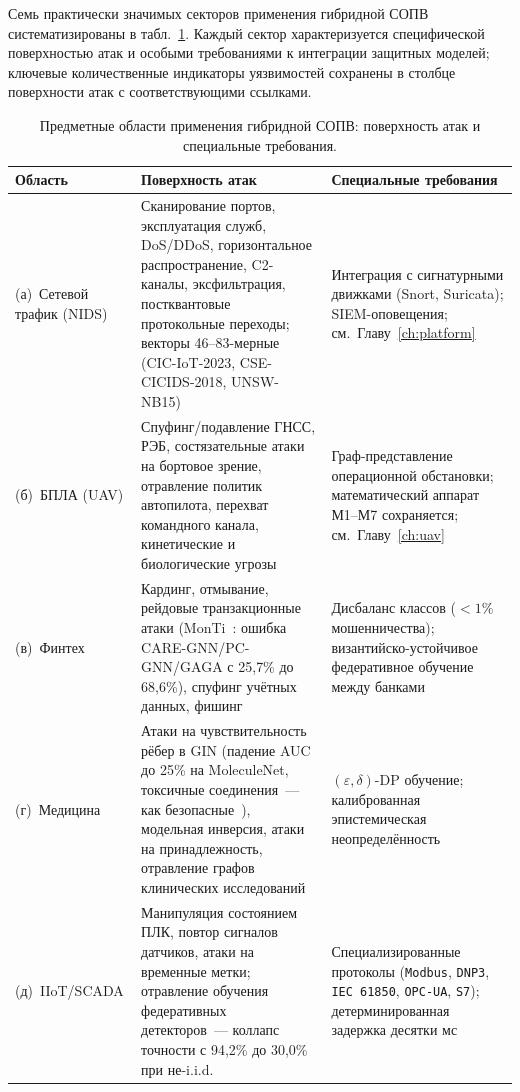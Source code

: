 Семь практически значимых секторов применения гибридной СОПВ систематизированы в табл.~\ref{tab:idps_sectors}. Каждый сектор характеризуется специфической поверхностью атак и особыми требованиями к интеграции защитных моделей; ключевые количественные индикаторы уязвимостей сохранены в столбце поверхности атак с соответствующими ссылками.

\begin{table}[htbp]
\centering
\caption{Предметные области применения гибридной СОПВ: поверхность атак и специальные требования.}
\label{tab:idps_sectors}
\small
\setlength{\tabcolsep}{4pt}
\begin{tabular}{p{2.8cm} p{6.5cm} p{5.0cm}}
\toprule
\textbf{Область} & \textbf{Поверхность атак} & \textbf{Специальные требования} \\
\midrule
(а)~Сетевой трафик (NIDS) & Сканирование портов, эксплуатация служб, DoS/DDoS, горизонтальное распространение, C2-каналы, эксфильтрация, постквантовые протокольные переходы; векторы 46--83-мерные (CIC-IoT-2023, CSE-CICIDS-2018, UNSW-NB15) & Интеграция с сигнатурными движками (Snort, Suricata); SIEM-оповещения; см.\ Главу~\ref{ch:platform} \\
\addlinespace
(б)~БПЛА (UAV) & Спуфинг/подавление ГНСС, РЭБ, состязательные атаки на бортовое зрение, отравление политик автопилота, перехват командного канала, кинетические и биологические угрозы & Граф-представление операционной обстановки; математический аппарат М1--М7 сохраняется; см.\ Главу~\ref{ch:uav} \\
\addlinespace
(в)~Финтех & Кардинг, отмывание, рейдовые транзакционные атаки (MonTi~\cite{MonTi2025}: ошибка CARE-GNN/PC-GNN/GAGA с 25{,}7\% до 68{,}6\%), спуфинг учётных данных, фишинг & Дисбаланс классов ($<\!1\%$ мошенничества); византийско-устойчивое федеративное обучение между банками \\
\addlinespace
(г)~Медицина & Атаки на чувствительность рёбер в GIN (падение AUC до 25\% на MoleculeNet, токсичные соединения~--- как безопасные~\cite{EdgeSensitivity2025}), модельная инверсия, атаки на принадлежность, отравление графов клинических исследований & $(\varepsilon,\delta)$-DP обучение; калиброванная эпистемическая неопределённость \\
\addlinespace
(д)~IIoT/SCADA & Манипуляция состоянием ПЛК, повтор сигналов датчиков, атаки на временные метки; отравление обучения федеративных детекторов~--- коллапс точности с 94{,}2\% до 30{,}0\% при не-i.i.d.~\cite{FerragPoisoning2023} & Специализированные протоколы (\texttt{Modbus}, \texttt{DNP3}, \texttt{IEC~61850}, \texttt{OPC-UA}, \texttt{S7}); детерминированная задержка десятки мс \\

\end{tabular}
\end{table}
